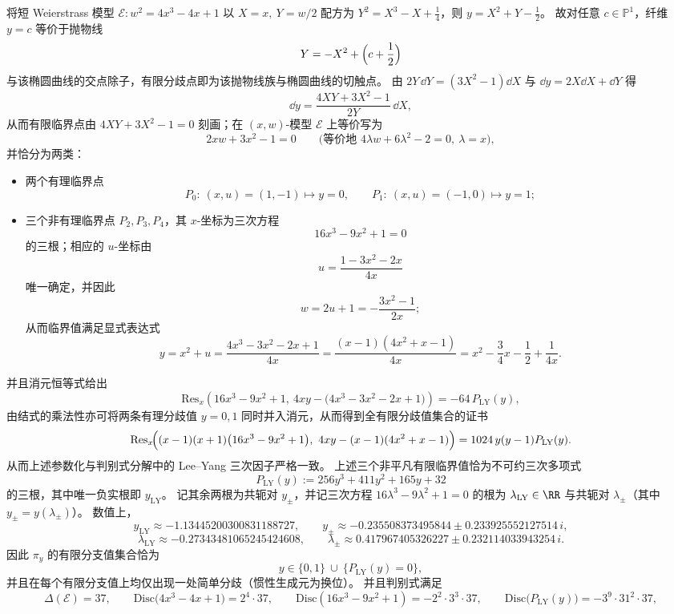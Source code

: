 \begin{theorem}
将短 Weierstrass 模型 \(\mathcal E:w^2=4x^3-4x+1\) 以 \(X=x,\ Y=w/2\) 配方为
\(
Y^2=X^3-X+\tfrac14
\)，则
\(
y=X^2+Y-\tfrac12
\)。
故对任意 \(c\in\mathbb P^1\)，纤维 \(y=c\) 等价于抛物线
\[
Y=-X^2+\Bigl(c+\frac12\Bigr)
\]
与该椭圆曲线的交点除子，有限分歧点即为该抛物线族与椭圆曲线的切触点。
由 \(2Y\,\dd Y=(3X^2-1)\dd X\) 与 \(\dd y=2X\dd X+\dd Y\) 得
\[
\dd y=\frac{4XY+3X^2-1}{2Y}\,\dd X,
\]
从而有限临界点由 \(4XY+3X^2-1=0\) 刻画；在 \((x,w)\)-模型 \(\mathcal E\) 上等价写为
\[
2xw+3x^2-1=0
\qquad\bigl(\text{等价地 }4\lambda w+6\lambda^2-2=0,\ \lambda=x\bigr),
\]
并恰分为两类：
\begin{itemize}
  \item 两个有理临界点
  \[
  P_0:\ (x,u)=(1,-1)\mapsto y=0,\qquad P_1:\ (x,u)=(-1,0)\mapsto y=1;
  \]
  \item 三个非有理临界点 \(P_2,P_3,P_4\)，其 \(x\)-坐标为三次方程
  \[
  16x^3-9x^2+1=0
  \]
  的三根；相应的 \(u\)-坐标由
  \[
  u=\frac{1-3x^2-2x}{4x}
  \]
  唯一确定，并因此
  \[
  w=2u+1=-\frac{3x^2-1}{2x};
  \]
  从而临界值满足显式表达式
  \[
  y=x^2+u=\frac{4x^3-3x^2-2x+1}{4x}
  =\frac{(x-1)(4x^2+x-1)}{4x}
  =x^{2}-\frac34x-\frac12+\frac{1}{4x}.
  \]
\end{itemize}
并且消元恒等式给出
\[
\mathrm{Res}_x\!\left(16x^3-9x^2+1,\ 4xy-\bigl(4x^3-3x^2-2x+1\bigr)\right)=-64\,P_{\mathrm{LY}}(y),
\]
由结式的乘法性亦可将两条有理分歧值 \(y=0,1\) 同时并入消元，从而得到全有限分歧值集合的证书
\[
\mathrm{Res}_x\!\Bigl((x-1)(x+1)\bigl(16x^3-9x^2+1\bigr),\ 4xy-(x-1)(4x^2+x-1)\Bigr)
=1024\,y(y-1)P_{\mathrm{LY}}(y).
\]
从而上述参数化与判别式分解中的 Lee--Yang 三次因子严格一致。
上述三个非平凡有限临界值恰为不可约三次多项式
\[
P_{\mathrm{LY}}(y):=256y^3+411y^2+165y+32
\]
的三根，其中唯一负实根即 \(y_{\mathrm{LY}}\)。
记其余两根为共轭对 \(y_{\pm}\)，并记三次方程 \(16\lambda^3-9\lambda^2+1=0\) 的根为
\(\lambda_{\mathrm{LY}}\in\RR\) 与共轭对 \(\lambda_{\pm}\)（其中 \(y_{\pm}=y(\lambda_{\pm})\)）。
数值上，
\[
y_{\mathrm{LY}}\approx -1.13445200300831188727,\qquad
y_{\pm}\approx -0.235508373495844\pm 0.233925552127514\,i,
\]
\[
\lambda_{\mathrm{LY}}\approx -0.27343481065245424608,\qquad
\lambda_{\pm}\approx 0.417967405326227\pm 0.232114033943254\,i.
\]
因此 \(\pi_y\) 的有限分支值集合恰为
\[
y\in\{0,1\}\ \cup\ \{P_{\mathrm{LY}}(y)=0\},
\]
并且在每个有限分支值上均仅出现一处简单分歧（惯性生成元为换位）。
并且判别式满足
\[
\Delta(\mathcal E)=37,
\qquad
\mathrm{Disc}\bigl(4x^3-4x+1\bigr)=2^{4}\cdot 37,
\qquad
\mathrm{Disc}(16x^3-9x^2+1)=-2^{2}\cdot 3^{3}\cdot 37,
\qquad
\mathrm{Disc}\bigl(P_{\mathrm{LY}}(y)\bigr)=-3^{9}\cdot 31^{2}\cdot 37,
\]
\end{theorem}
